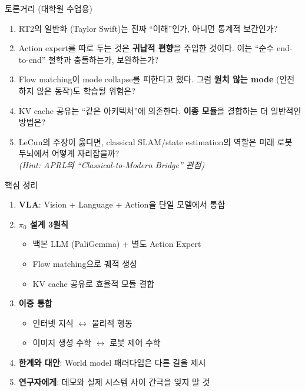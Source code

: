 \documentclass[aspectratio=169,10pt]{beamer}
\begin{document}
\begin{frame}{토론거리 (대학원 수업용)}
\begin{enumerate}
  \item RT2의 일반화 (Taylor Swift)는 진짜 ``이해''인가, 아니면 통계적 보간인가?
  \vspace{0.3em}
  \item Action expert를 따로 두는 것은 \textbf{귀납적 편향}을 주입한 것이다. 이는 ``순수 end-to-end'' 철학과 충돌하는가, 보완하는가?
  \vspace{0.3em}
  \item Flow matching이 mode collapse를 피한다고 했다. 그럼 \textbf{원치 않는 mode} (안전하지 않은 동작)도 학습될 위험은?
  \vspace{0.3em}
  \item KV cache 공유는 ``같은 아키텍처''에 의존한다. \textbf{이종 모듈}을 결합하는 더 일반적인 방법은?
  \vspace{0.3em}
  \item LeCun의 주장이 옳다면, classical SLAM/state estimation의 역할은 미래 로봇 두뇌에서 어떻게 자리잡을까? \\
        \footnotesize\textit{(Hint: APRL의 ``Classical-to-Modern Bridge'' 관점)}
\end{enumerate}
\end{frame}

\begin{frame}{핵심 정리}
\begin{enumerate}
  \item \textbf{VLA}: Vision + Language + Action을 단일 모델에서 통합
  \vspace{0.2em}
  \item \textbf{$\pi_0$ 설계 3원칙}
    \begin{itemize}
      \footnotesize
      \item 백본 LLM (PaliGemma) + 별도 Action Expert
      \item Flow matching으로 궤적 생성
      \item KV cache 공유로 효율적 모듈 결합
    \end{itemize}
  \vspace{0.2em}
  \item \textbf{이중 통합}
    \begin{itemize}
      \footnotesize
      \item 인터넷 지식 $\leftrightarrow$ 물리적 행동
      \item 이미지 생성 수학 $\leftrightarrow$ 로봇 제어 수학
    \end{itemize}
  \vspace{0.2em}
  \item \textbf{한계와 대안}: World model 패러다임은 다른 길을 제시
  \vspace{0.2em}
  \item \textbf{연구자에게}: 데모와 실제 시스템 사이 간극을 잊지 말 것
\end{enumerate}
\end{frame}
\end{document}
